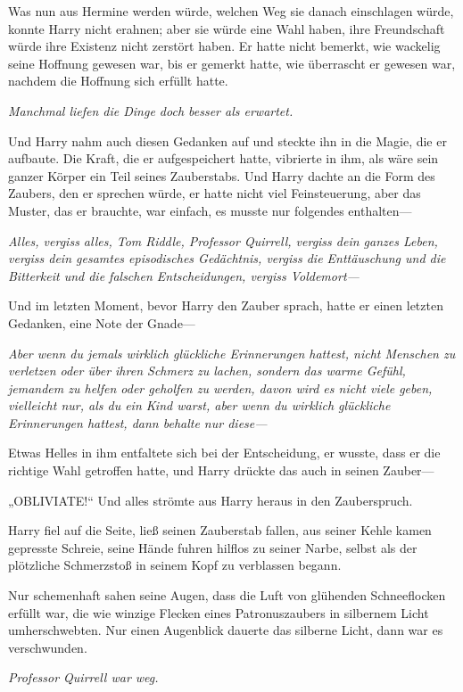 {Was nun aus Hermine werden würde, welchen Weg sie danach einschlagen würde, konnte Harry nicht erahnen; aber sie würde eine Wahl haben, ihre Freundschaft würde ihre Existenz nicht zerstört haben. Er hatte nicht bemerkt, wie wackelig seine Hoffnung gewesen war, bis er gemerkt hatte, wie überrascht er gewesen war, nachdem die Hoffnung sich erfüllt hatte.

\emph{Manchmal liefen die Dinge doch besser als erwartet.}

Und Harry nahm auch diesen Gedanken auf und steckte ihn in die Magie, die er aufbaute. Die Kraft, die er aufgespeichert hatte, vibrierte in ihm, als wäre sein ganzer Körper ein Teil seines Zauberstabs. Und Harry dachte an die Form des Zaubers, den er sprechen würde, er hatte nicht viel Feinsteuerung, aber das Muster, das er brauchte, war einfach, es musste nur folgendes enthalten—

\emph{Alles, vergiss alles, Tom Riddle, Professor Quirrell, vergiss dein ganzes Leben, vergiss dein gesamtes episodisches Gedächtnis, vergiss die Enttäuschung und die Bitterkeit und die falschen Entscheidungen, vergiss Voldemort—}

Und im letzten Moment, bevor Harry den Zauber sprach, hatte er einen letzten Gedanken, eine Note der Gnade—

\emph{Aber wenn du jemals wirklich glückliche Erinnerungen hattest, nicht Menschen zu verletzen oder über ihren Schmerz zu lachen, sondern das warme Gefühl, jemandem zu helfen oder geholfen zu werden, davon wird es nicht viele geben, vielleicht nur, als du ein Kind warst, aber wenn du wirklich glückliche Erinnerungen hattest, dann behalte nur diese—}

Etwas Helles in ihm entfaltete sich bei der Entscheidung, er wusste, dass er die richtige Wahl getroffen hatte, und Harry drückte das auch in seinen Zauber—

„OBLIVIATE!“ Und alles strömte aus Harry heraus in den Zauberspruch.

Harry fiel auf die Seite, ließ seinen Zauberstab fallen, aus seiner Kehle kamen gepresste Schreie, seine Hände fuhren hilflos zu seiner Narbe, selbst als der plötzliche Schmerzstoß in seinem Kopf zu verblassen begann.

Nur schemenhaft sahen seine Augen, dass die Luft von glühenden Schneeflocken erfüllt war, die wie winzige Flecken eines Patronuszaubers in silbernem Licht umherschwebten. Nur einen Augenblick dauerte das silberne Licht, dann war es verschwunden.

\emph{Professor Quirrell war weg.}

}
